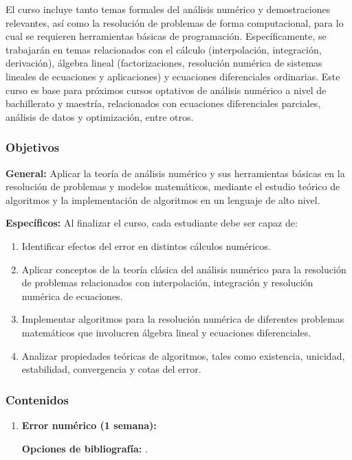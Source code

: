 \begin{refsection}
El curso incluye tanto temas formales del análisis numérico y demostraciones relevantes, así como la resolución de problemas de forma computacional, para lo cual se requieren herramientas básicas de programación. Específicamente, se trabajarán en temas relacionados con el cálculo (interpolación, integración, derivación), álgebra lineal (factorizaciones, resolución numérica de sistemas lineales de ecuaciones y aplicaciones) y ecuaciones diferenciales ordinarias. Este curso es base para próximos cursos optativos de análisis numérico a nivel de bachillerato y maestría, relacionados con ecuaciones diferenciales parciales, análisis de datos y optimización, entre otros.

\subsubsection*{Objetivos}

\textbf{General:} 
Aplicar la teoría de análisis numérico y sus herramientas básicas en la resolución de problemas y modelos matemáticos, mediante el estudio teórico de algoritmos y la implementación de algoritmos en un lenguaje de alto nivel. 

\textbf{Específicos:}
Al finalizar el curso, cada estudiante debe ser capaz de:
\begin{enumerate}
	\item  Identificar efectos del error en distintos cálculos numéricos.
	\item Aplicar conceptos de la teoría clásica del análisis numérico para la resolución de problemas relacionados con interpolación, integración y resolución numérica de ecuaciones.
	\item Implementar algoritmos para la resolución numérica de diferentes problemas matemáticos que involucren álgebra lineal y ecuaciones diferenciales.
	\item Analizar propiedades teóricas de algoritmos, tales como existencia, unicidad, estabilidad, convergencia y cotas del error.
\end{enumerate}

\subsubsection*{Contenidos}
\begin{enumerate}
\item \textbf{Error numérico (1 semana):}

\textbf{Opciones de bibliografía:} \cite{Overton}.


\end{enumerate}
\end{refsection}
